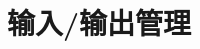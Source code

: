 \documentclass[./operating-systems.tex]{subfiles}
\begin{document}
    \section{输入/输出管理}
\end{document}
